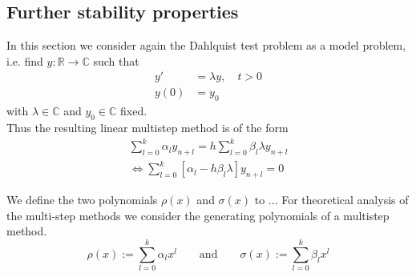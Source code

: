 	
	\subsection{Further stability properties}
	
	In this section we consider again the Dahlquist test problem as a model problem, i.e. find $y:\mathbb{R} \to \mathbb{C}$ such that
	\begin{align}
		y' &= \lambda y, \quad t > 0 \\
		y(0) &= y_0
	\end{align}
	with $\lambda \in \mathbb{C}$ and $y_0 \in \mathbb{C}$ fixed.\\
	
	
	Thus the resulting linear multistep method is of the form
	\begin{align*}
		\sum_{l=0}^{k} \alpha_l y_{n+l} = h \sum_{l=0}^{k} \beta_l \lambda y_{n+l} \\
		\iff \sum_{l=0}^{k}  [\alpha_l - h \beta_l \lambda] y_{n+l} = 0
	\end{align*}
	
	
	We define the two polynomials $\rho(x)$ and $\sigma(x)$ to ...
	For theoretical analysis of the multi-step methods we consider the generating polynomials of a multistep method.
	\begin{equation}
		\label{eq:generating polynomials multistep method}
		\rho(x) := \sum_{l=0}^{k} \alpha_l x^l
		\qquad \text{and} \qquad
		\sigma(x) := \sum_{l=0}^{k} \beta_l x^l
	\end{equation}
	
